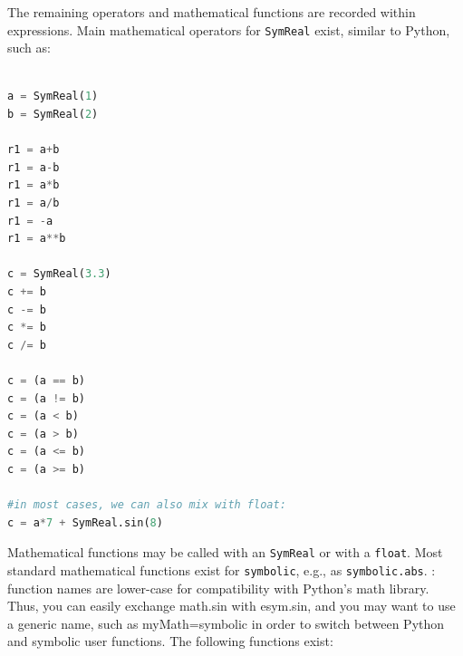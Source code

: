 The remaining operators and mathematical functions are recorded within expressions. Main mathematical operators for \texttt{SymReal} exist, similar to Python, such as:
\pythonstyle
\begin{lstlisting}[language=Python, firstnumber=1]

a = SymReal(1)
b = SymReal(2)

r1 = a+b
r1 = a-b
r1 = a*b
r1 = a/b
r1 = -a
r1 = a**b

c = SymReal(3.3)
c += b
c -= b
c *= b
c /= b

c = (a == b)
c = (a != b)
c = (a < b)
c = (a > b)
c = (a <= b)
c = (a >= b)

#in most cases, we can also mix with float:
c = a*7 + SymReal.sin(8)
\end{lstlisting}


Mathematical functions may be called with an \texttt{SymReal} or with a \texttt{float}. Most standard mathematical functions exist for \texttt{symbolic}, e.g., as \texttt{symbolic.abs}. : function names are lower-case for compatibility with Python's math library. Thus, you can easily exchange math.sin with esym.sin, and you may want to use a generic name, such as myMath=symbolic in order to switch between Python and symbolic user functions. The following functions exist:
